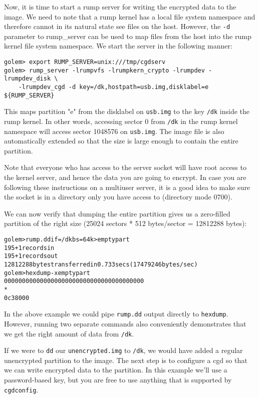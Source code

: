 Now, it is time to start a rump server for writing the encrypted
data to the image.  We need to note that a rump kernel has a local
file system namespace and therefore cannot in its natural state
see files on the host.  However, the \verb+-d+ parameter
to rump\_server can be used to map files from the host into the
rump kernel file system namespace.  We start the server in the
following manner:

{\footnotesize
\begin{verbatim}
golem> export RUMP_SERVER=unix:///tmp/cgdserv
golem> rump_server -lrumpvfs -lrumpkern_crypto -lrumpdev -lrumpdev_disk \
    -lrumpdev_cgd -d key=/dk,hostpath=usb.img,disklabel=e ${RUMP_SERVER}
\end{verbatim}}

This maps partition "e" from the disklabel on \verb+usb.img+
to the key \verb+/dk+ inside the rump kernel.  In
other words, accessing sector 0 from \verb+/dk+ in
the rump kernel namespace will access sector 1048576 on
\verb+usb.img+.  The image file is also automatically
extended so that the size is large enough to contain the entire
partition.

Note that everyone who has access to the server socket will have
root access to the kernel server, and hence the data you are going
to encrypt.  In case you are following these instructions on a
multiuser server, it is a good idea to make sure the socket is in
a directory only you have access to (directory mode 0700).

We can now verify that dumping the entire partition gives us a
zero-filled partition of the right size (25024 sectors * 512
bytes/sector = 12812288 bytes):

{\footnotesize
\begin{alltt}
golem> rump.dd if=/dk bs=64k > emptypart
195+1 records in
195+1 records out
12812288 bytes transferred in 0.733 secs (17479246 bytes/sec)
golem> hexdump -x emptypart 
0000000    0000    0000    0000    0000    0000    0000    0000    0000
*
0c38000
\end{alltt}}

In the above example we could pipe \verb+rump.dd+ output directly
to \verb+hexdump+.  However, running two separate commands
also conveniently demonstrates that we get the right amount of data
from \verb+/dk+.

If we were to \verb+dd+ our \verb+unencrypted.img+ to \verb+/dk+, we would have added a
regular unencrypted partition to the image.  The next step is to
configure a cgd so that we can write encrypted data to the partition.
In this example we'll use a password-based key, but you are free to
use anything that is supported by \texttt{cgdconfig}.


